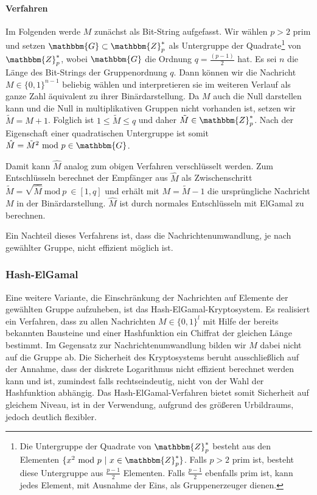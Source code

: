 \paragraph*{Verfahren} Im Folgenden werde $M$ zunächst als Bit-String
aufgefasst. Wir wählen $p > 2 $ prim und setzen $\mathbbm{G} \subset
\mathbbm{Z}^*_p$ als Untergruppe der Quadrate\footnote{Die Untergruppe
  der Quadrate von $\mathbbm{Z}^*_p$ besteht aus den Elementen $\{x^2
  \text{ mod } p\ \vert\ x \in \mathbbm{Z}^*_p\}$. Falls $p > 2$ prim ist,
  besteht diese Untergruppe aus $\frac{p - 1}{2}$ Elementen. Falls
  $\frac{p - 1}{2}$ ebenfalls prim ist, kann jedes Element, mit Ausnahme
  der Eins, als Gruppenerzeuger dienen.} von
$\mathbbm{Z}^*_p$, wobei $\mathbbm{G}$ die Ordnung $q = \frac{(p -
  1)}{2}$ hat.  Es sei $n$ die Länge des Bit-Strings der Gruppenordnung
$q$. Dann können wir die Nachricht $M \in \{0, 1\}^{n - 1}$ beliebig
wählen und interpretieren sie im weiteren Verlauf als ganze Zahl
äquivalent zu ihrer Binärdarstellung. Da $M$ auch die Null darstellen
kann und die Null in multiplikativen Gruppen nicht vorhanden ist, setzen
wir $\tilde{M} = M + 1$. Folglich ist $ 1 \leq \tilde{M} \leq q$ und
daher $\tilde{M} \in \mathbbm{Z}^*_p$. Nach der Eigenschaft einer
quadratischen Untergruppe ist somit $\hat{M} = \tilde{M}^2 \text{ mod }
p \in \mathbbm{G}$.

Damit kann $\hat{M}$ analog zum obigen Verfahren verschlüsselt
werden. Zum Entschlüsseln berechnet der Empfänger aus $\hat{M}$ als
Zwischenschritt $\tilde{M} = \sqrt{\hat{M}}\ \text{mod}\ p\ \in [1, q]$
und erhält mit $M = \tilde{M} - 1$ die ursprüngliche Nachricht $M$ in
der Binärdarstellung. $\hat{M}$ ist durch normales Entschlüsseln mit
ElGamal zu berechnen.

Ein Nachteil dieses Verfahrens ist, dass die Nachrichtenumwandlung, je
nach gewählter Gruppe, nicht effizient möglich ist.

\subsubsection{Hash-ElGamal} Eine weitere Variante, die Einschränkung
der Nachrichten auf Elemente der gewählten Gruppe aufzuheben, ist das
Hash-ElGamal-Kryptosystem\indexHashElGamal. Es realisiert ein Verfahren,
dass zu allen Nachrichten $M \in \{0, 1\}^l$ mit Hilfe der bereits
bekannten Bausteine und einer Hashfunktion ein Chiffrat der gleichen
Länge bestimmt. Im Gegensatz zur Nachrichtenumwandlung bilden wir $M$
dabei nicht auf die Gruppe ab. Die Sicherheit des Kryptosystems beruht
ausschließlich auf der Annahme, dass der diskrete Logarithmus nicht
effizient berechnet werden kann und ist, zumindest falls
rechtseindeutig, nicht von der Wahl der Hashfunktion abhängig. Das
Hash-ElGamal-Verfahren bietet somit Sicherheit auf gleichem Niveau, ist
in der Verwendung, aufgrund des größeren Urbildraums, jedoch deutlich
flexibler.

